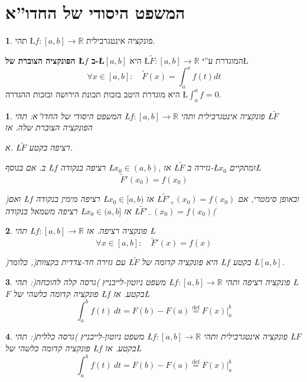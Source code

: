 \documentclass[english,hebrew]{article}
\theoremstyle{remark}
\theoremstyle{definition}
\newtheorem*{defn*}{\protect\definitionname}
\theoremstyle{plain}
\newtheorem{thm}{\protect\theoremname}
\theoremstyle{remark}
\theoremstyle{plain}
\newtheorem{cor}[thm]{\protect\corollaryname}
\theoremstyle{plain}
\providecommand{\corollaryname}{מסקנה}
\providecommand{\definitionname}{הגדרה}
\providecommand{\theoremname}{משפט}
\begin{document}
\part{המשפט היסודי של החדו\textquotedblright א}
\begin{defn*}
תהי \L{$f:\left[a,b\right]\rightarrow\mathbb{R}$} פונקציה אינטגרבילית.

\textbf{הפונקציה הצוברת של \L{$f$} ב-\L{$\left[a,b\right]$} }היא
\L{$\tilde{F}:\left[a,b\right]\rightarrow\mathbb{R}$} המוגדרת ע\textquotedblright י\L{%
\[
\forall x\in\left[a,b\right]:\quad\tilde{F}\left(x\right)=\int_{a}^{x}f(t)dt
\]
}%
 היא מוגדרת היטב בזכות תכונת הירושה ובזכות ההגדרה \L{$\int_{a}^{a}f=0$}.
\end{defn*}
\begin{thm}
המשפט היסודי של החדו\textquotedblright א: תהי \L{$f:\left[a,b\right]\rightarrow\mathbb{R}$}
פונקציה אינטגרבילית ותהי \L{$\tilde{F}$} הפונקציה הצוברת שלה. אז

א. \L{$\tilde{F}$} רציפה בקטע.

ב. אם בנוסף \L{$f$} רציפה בנקודה \L{$x_{0}\in\left(a,b\right)$},
אז \L{$\tilde{F}$} גזירה ב-\L{$x_{0}$} ומתקיים\L{%
\[
\tilde{F}'\left(x_{0}\right)=f\left(x_{0}\right)
\]
}%

)ואם \L{$f$} רציפה מימין בנקודה \L{$x_{0}\in[a,b)$} אז \L{$\tilde{F}'_{+}\left(x_{0}\right)=f\left(x_{0}\right)$}
ובאופן סימטרי, אם רציפה משמאל בנקודה \L{$x_{0}\in(a,b]$} אז \L{$\tilde{F}'_{-}\left(x_{0}\right)=f\left(x_{0}\right)$}(
\end{thm}

\begin{cor}
תהי \L{$f:\left[a,b\right]\rightarrow\mathbb{R}$} פונקציה רציפה.
אז \L{%
\[
\forall x\in\left[a,b\right]:\quad\tilde{F}'\left(x\right)=f(x)
\]
}%

)עם גזירה חד-צדדית בקצוות(, כלומר \L{$\tilde{F}$} היא פונקציה קדומה
של \L{$f$} בקטע \L{$\left[a,b\right]$}.
\end{cor}

\begin{thm}
משפט ניוטון-לייבניץ )גרסה קלה להוכחה(: תהי \L{$f:\left[a,b\right]\rightarrow\mathbb{R}$}
פונקציה רציפה ותהי \L{$F$} פונקציה קדומה כלשהי של \L{$f$} בקטע.
אז\L{%
\[
\int_{a}^{b}f(t)\ dt=F\left(b\right)-F\left(a\right)\overset{\text{def}}{=}F\left(x\right)|_{a}^{b}
\]
}%
\end{thm}

\begin{thm}
משפט ניוטון-לייבניץ )גרסה כללית(: תהי \L{$f:\left[a,b\right]\rightarrow\mathbb{R}$}
פונקציה אינטגרבילית ותהי \L{$F$} פונקציה קדומה כלשהי של \L{$f$}
בקטע. אז\L{%
\[
\int_{a}^{b}f(t)\ dt=F\left(b\right)-F\left(a\right)\overset{\text{def}}{=}F\left(x\right)|_{a}^{b}
\]
}%
\end{thm}
\end{document}
